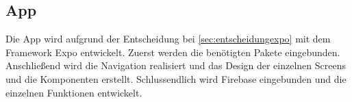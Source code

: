 \subsection{App}
Die App wird aufgrund der Entscheidung bei \ref{sec:entscheidungexpo} mit dem \Gls{Framework} Expo entwickelt. Zuerst werden die benötigten Pakete eingebunden. Anschließend wird die Navigation realisiert und das Design der einzelnen Screens und die Komponenten erstellt. Schlussendlich wird Firebase eingebunden und die einzelnen Funktionen entwickelt.\\








